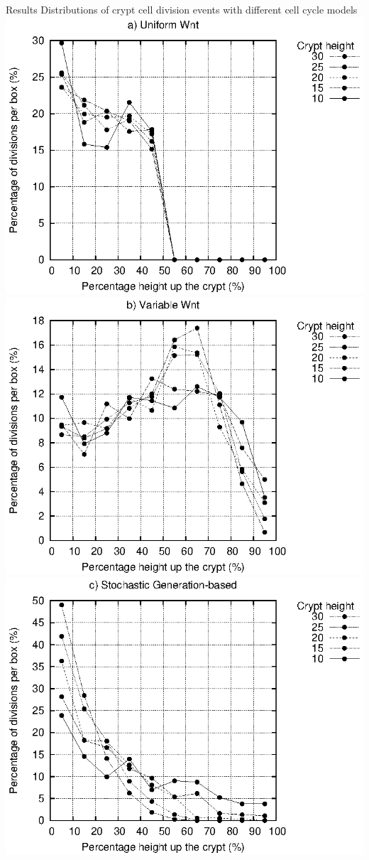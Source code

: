 \documentclass[t,xcolor={usenames,dvipsnames}]{beamer}
\begin{document}
\begin{frame}{Results}
\vspace{-.45cm}
{\footnotesize Distributions of crypt cell division events with different cell cycle models}
\vspace{-.1cm}
\hspace*{2mm}
\includegraphics[width=.45\textwidth]{Uniform_Wnt-Cell_division_locations}
\hspace*{5mm}
\includegraphics[width=.45\textwidth]{Variable_Wnt-Cell_division_locations}\\
\hspace*{2mm}
\includegraphics[width=.45\textwidth]{Stochastic_Generation-based-Cell_division_locations}
\hspace*{12mm}

\end{frame}
\end{document}
